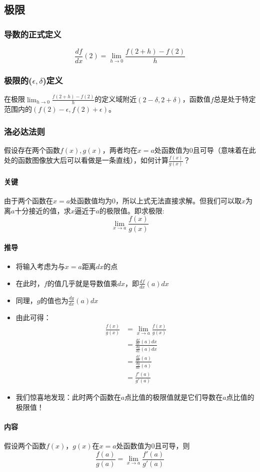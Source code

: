 \documentclass[UTF8]{ctexart}
\begin{document}
\subsection{极限}
\subsubsection{导数的正式定义}
$$\frac{df}{dx}(2) = \lim_{h\to0}\frac{f(2+h)-f(2)}{h}$$
\subsubsection{极限的($\epsilon,\delta$)定义}
在极限$\lim_{h\to0}\frac{f(2+h)-f(2)}{h}$的定义域附近$(2-\delta, 2+\delta)$，函数值$f$总是处于特定范围内的$(f(2)-\epsilon, f(2)+\epsilon)$。
\subsubsection{洛必达法则}
假设存在两个函数$f(x),g(x)$，两者均在$x=a$处函数值为0且可导（意味着在此处的函数图像放大后可以看做是一条直线），如何计算$\frac{f(x)}{g(x)}$？
\paragraph{关键}
由于两个函数在$x=a$处函数值均为0，所以上式无法直接求解。但我们可以取$x$为离$a$十分接近的值，求$x$逼近于$a$的极限值。即求极限:
$$\lim_{x\to a}\frac{f(x)}{g(x)}$$
\paragraph{推导}
\begin{itemize}
	\item 将输入考虑为与$x=a$距离$dx$的点
	\item 在此时，$f$的值几乎就是导数值乘$dx$，即$\frac{df}{dx}(a)dx$
	\item 同理，$g$的值也为$\frac{dg}{dx}(a)dx$
	\item 由此可得： \begin{align*}
		\frac{f(x)}{g(x)} &= \lim_{x\to a}\frac{f(x)}{g(x)} \\
		&= \frac{\frac{df}{dx}(a)dx}{\frac{dg}{dx}(a)dx} \\
		&= \frac{\frac{df}{dx}(a)}{\frac{dg}{dx}(a)} \\
		&= \frac{f'(a)}{g'(a)}
	\end{align*}
	\item 我们惊喜地发现：此时两个函数在$a$点比值的极限值就是它们导数在$a$点比值的极限值！
\end{itemize}
\paragraph{内容}
假设两个函数$f(x)$，$g(x)$在$x=a$处函数值为0且可导，则$$\frac{f(a)}{g(a)} = \lim_{x\to a}\frac{f'(a)}{g'(a)}$$
\end{document}
